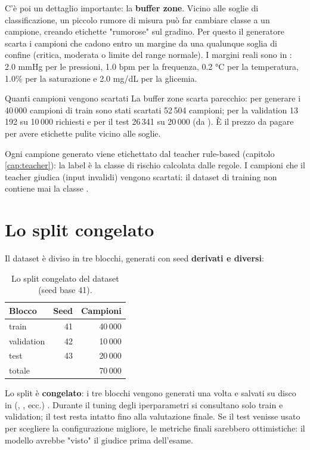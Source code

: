 C'è poi un dettaglio importante: la \textbf{buffer zone}. Vicino alle soglie
di classificazione, un piccolo rumore di misura può far cambiare classe a un
campione, creando etichette "rumorose" sul gradino. Per questo il generatore
scarta i campioni che cadono entro un margine da una qualunque soglia di
confine (critica, moderata o limite del range normale). I margini reali sono
in : 2.0 mmHg per le pressioni, 1.0 bpm per la
frequenza, 0.2 °C per la temperatura, 1.0\% per la saturazione e 2.0 mg/dL
per la glicemia.

\begin{esempio}{Quanti campioni vengono scartati}
La buffer zone scarta parecchio: per generare i 40\,000 campioni di train
sono stati scartati 52\,504 campioni; per la validation 13\,192 su 10\,000
richiesti e per il test 26\,341 su 20\,000 (da
). È il prezzo da pagare per avere
etichette pulite vicino alle soglie.
\end{esempio}

Ogni campione generato viene etichettato dal teacher rule-based
(capitolo \ref{cap:teacher}): la label è la classe di rischio calcolata
dalle regole. I campioni che il teacher giudica  (input
invalidi) vengono scartati: il dataset di training non contiene mai la
classe .

\section{Lo split congelato}\label{sec:split-congelato}

Il dataset è diviso in tre blocchi, generati con seed \textbf{derivati e
diversi}:

\begin{table}[h]
\centering
\caption{Lo split congelato del dataset (seed base 41).}
\label{tab:split}
\begin{tabular}{lrr}
\toprule
\textbf{Blocco} & \textbf{Seed} & \textbf{Campioni} \\
\midrule
train & 41 & 40\,000 \\
validation & 42 & 10\,000 \\
test & 43 & 20\,000 \\
\midrule
totale & & 70\,000 \\
\bottomrule
\end{tabular}
\end{table}

Lo split è \textbf{congelato}: i tre blocchi vengono generati una volta e
salvati su disco in  (,
, ecc.) \cite{knowledge_ml2026}. Durante il tuning degli iperparametri si
consultano solo train e validation; il test resta intatto fino alla
valutazione finale. Se il test venisse usato per scegliere la configurazione
migliore, le metriche finali sarebbero ottimistiche: il modello avrebbe
"visto" il giudice prima dell'esame.

